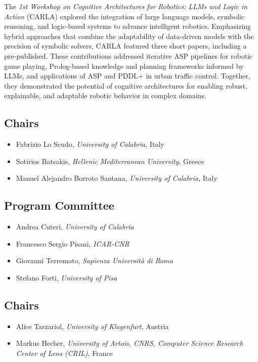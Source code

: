 \documentclass[
]{ceurart}
\begin{document}

\noindent
The \emph{1st Workshop on Cognitive Architectures for Robotics: LLMs and Logic in Action} (CARLA) explored the integration of large language models, symbolic reasoning, and logic-based systems to advance intelligent robotics. Emphasizing hybrid approaches that combine the adaptability of data-driven models with the precision of symbolic solvers, CARLA featured three short papers, including a pre-published. These contributions addressed iterative ASP pipelines for robotic game playing, Prolog-based knowledge and planning frameworks informed by LLMs, and applications of ASP and PDDL+ in urban traffic control. Together, they demonstrated the potential of cognitive architectures for enabling robust, explainable, and adaptable robotic behavior in complex domains.

\subsection*{Chairs}
\begin{itemize}
\item Fabrizio Lo Scudo, \emph{University of Calabria}, Italy

\item Sotirios Batsakis, \emph{Hellenic Mediterranean University}, Greece

\item Manuel Alejandro Borroto Santana, \emph{University of Calabria}, Italy
\end{itemize}

\subsection*{Program Committee}
\begin{itemize}
  \item Andrea Cuteri, \emph{University of Calabria}
  \item Francesco Sergio Pisani, \emph{ICAR-CNR}
  \item Giovanni Terremoto, \emph{Sapienza Università di Roma}
  \item Stefano Forti, \emph{University of Pisa}
\end{itemize}



\subsection*{Chairs}
\begin{itemize}
\item Alice Tarzariol, \emph{University of Klagenfurt}, Austria

\item Markus Hecher, \emph{University of Artois, CNRS, Computer Science Research Center of Lens (CRIL)}, France
\end{itemize}
\end{document}
